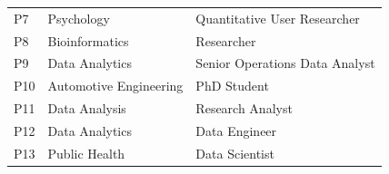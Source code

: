 {\begin{table}[ht]
\begin{tabular}{l|l|l}
            P7 & Psychology & Quantitative User Researcher \\ %
            P8 & Bioinformatics  & Researcher  \\ %
            P9 & Data Analytics & Senior Operations Data Analyst \\ %
            P10 & Automotive Engineering & PhD Student \\ %
            P11 & Data Analysis & Research Analyst \\ %
            P12 & Data Analytics & Data Engineer \\ %
            P13 & Public Health & Data Scientist \\ %
        \end{tabular}
    \label{tab:summativeEvaluationParticipants}
  \end{table}
}

\newcommand{\mysmaller}{\fontsize{9pt}{9pt}\selectfont}
\newcommand{\smalltt}[1]{{\mysmaller \texttt{#1}}}

